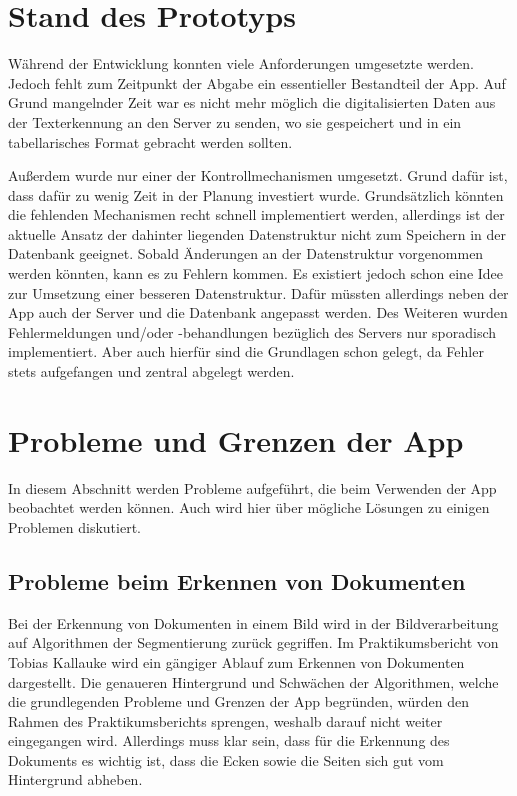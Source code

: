 \documentclass[notables, nomenclature, oneside, 150]{HSMW-Thesis}
\begin{document}
	\section{Stand des Prototyps}
		Während der Entwicklung konnten viele Anforderungen umgesetzte werden. Jedoch fehlt zum Zeitpunkt der Abgabe ein essentieller Bestandteil der App. Auf Grund mangelnder Zeit war es nicht mehr möglich die digitalisierten Daten aus der Texterkennung an den Server zu senden, wo sie gespeichert und in ein tabellarisches Format gebracht werden sollten. 
		
		Außerdem wurde nur einer der Kontrollmechanismen umgesetzt. Grund dafür ist, dass dafür zu wenig Zeit in der Planung investiert wurde. Grundsätzlich könnten die fehlenden Mechanismen recht schnell implementiert werden, allerdings ist der aktuelle Ansatz der dahinter liegenden Datenstruktur nicht zum Speichern in der Datenbank geeignet. Sobald Änderungen an der Datenstruktur vorgenommen werden könnten, kann es zu Fehlern kommen. Es existiert jedoch schon eine Idee zur Umsetzung einer besseren Datenstruktur. Dafür müssten allerdings neben der App auch der Server und die Datenbank angepasst werden. Des Weiteren wurden Fehlermeldungen und/oder -behandlungen bezüglich des Servers nur sporadisch implementiert. Aber auch hierfür sind die Grundlagen schon gelegt, da Fehler stets aufgefangen und zentral abgelegt werden. 
	
%	
%	
%	
%	
%	
%	
	\section{Probleme und Grenzen der App}\label{sc:grenzen}
		In diesem Abschnitt werden Probleme aufgeführt, die beim Verwenden der App beobachtet werden können. Auch wird hier über mögliche Lösungen zu einigen Problemen diskutiert.

		\subsection{Probleme beim Erkennen von Dokumenten}\label{ssc:erkennen}
			Bei der Erkennung von Dokumenten in einem Bild wird in der Bildverarbeitung auf Algorithmen der Segmentierung zurück gegriffen. Im Praktikumsbericht von Tobias Kallauke wird ein gängiger Ablauf zum Erkennen von Dokumenten dargestellt. Die genaueren Hintergrund und Schwächen der Algorithmen, welche die grundlegenden Probleme und Grenzen der App begründen, würden den Rahmen des Praktikumsberichts sprengen, weshalb darauf nicht weiter eingegangen wird. Allerdings muss klar sein, dass für die Erkennung des Dokuments es wichtig ist, dass die Ecken sowie die Seiten sich gut vom Hintergrund abheben.
		
\end{document}
